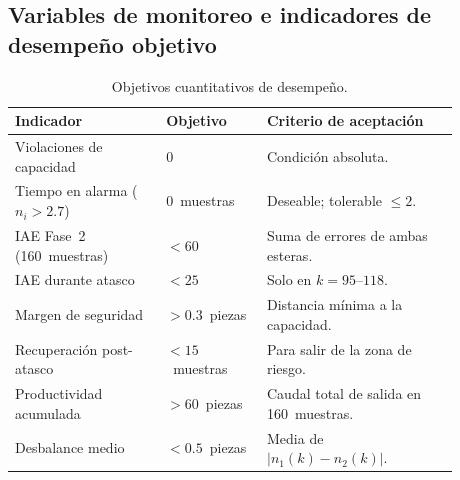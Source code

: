 \subsection*{Variables de monitoreo e indicadores de desempeño objetivo}

\begin{table}[H]
\centering
\small
\caption{Objetivos cuantitativos de desempeño.}
\label{tab:obj_desempeno}
\begin{tabular}{@{}P{0.30\linewidth}P{0.20\linewidth}P{0.38\linewidth}@{}}
\toprule
Indicador & Objetivo & Criterio de aceptación \\ \midrule
Violaciones de capacidad & 0 & Condición absoluta.\\
Tiempo en alarma ($n_i>2.7$) & 0~muestras & Deseable; tolerable $\leq 2$.\\
IAE Fase~2 (160~muestras) & $<60$ & Suma de errores de ambas esteras.\\
IAE durante atasco & $<25$ & Solo en $k=95$--$118$.\\
Margen de seguridad & $>0.3$~piezas & Distancia mínima a la capacidad.\\
Recuperación post-atasco & $<15$~muestras & Para salir de la zona de riesgo.\\
Productividad acumulada & $>60$~piezas & Caudal total de salida en 160~muestras.\\
Desbalance medio & $<0.5$~piezas & Media de $|n_1(k)-n_2(k)|$.\\
\bottomrule
\end{tabular}
\end{table}
